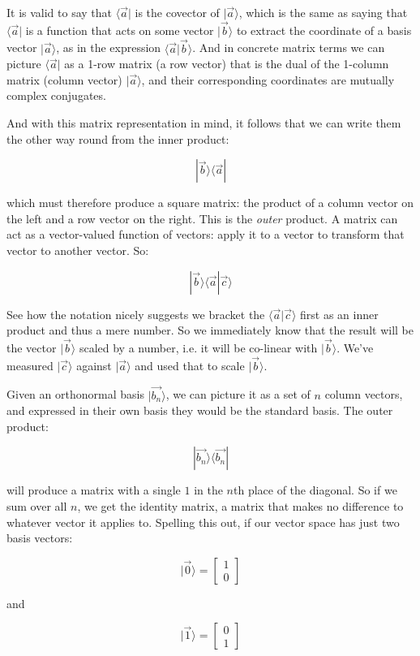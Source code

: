It is valid to say that $\langle \vec{a}|$ is the covector of $|\vec{a} \rangle$, which is the same as saying that $\langle \vec{a}|$ is a function that acts on some vector $|\vec{b} \rangle$ to extract the coordinate of a basis vector $|\vec{a} \rangle$, as in the expression $\langle \vec{a}|\vec{b} \rangle$. And in concrete matrix terms we can picture $\langle \vec{a}|$ as a 1-row matrix (a row vector) that is the dual of the 1-column matrix (column vector) $|\vec{a} \rangle$, and their corresponding coordinates are mutually complex conjugates.

And with this matrix representation in mind, it follows that we can write them the other way round from the inner product:

$$|\vec{b} \rangle \langle \vec{a} |$$

which must therefore produce a square matrix: the product of a column vector on the left and a row vector on the right. This is the \textit{outer} product. A matrix can act as a vector-valued function of vectors: apply it to a vector to transform that vector to another vector. So:

$$|\vec{b} \rangle \langle \vec{a} | \vec{c} \rangle$$

See how the notation nicely suggests we bracket the $\langle \vec{a} | \vec{c} \rangle$ first as an inner product and thus a mere number. So we immediately know that the result will be the vector $|\vec{b} \rangle$ scaled by a number, i.e. it will be co-linear with $|\vec{b} \rangle$. We've measured $|\vec{c} \rangle$ against $|\vec{a} \rangle$ and used that to scale $|\vec{b} \rangle$.

Given an orthonormal basis $|\vec{b_n} \rangle$, we can picture it as a set of $n$ column vectors, and expressed in their own basis they would be the standard basis. The outer product:

$$|\vec{b_n} \rangle \langle \vec{b_n} |$$

will produce a matrix with a single $1$ in the $n$th place of the diagonal. So if we sum over all $n$, we get the identity matrix, a matrix that makes no difference to whatever vector it applies to. Spelling this out, if our vector space has just two basis vectors:

$$|\vec{0} \rangle = \begin{bmatrix} 1 \\ 0 \end{bmatrix}$$

and

$$|\vec{1} \rangle = \begin{bmatrix} 0 \\ 1 \end{bmatrix}$$

